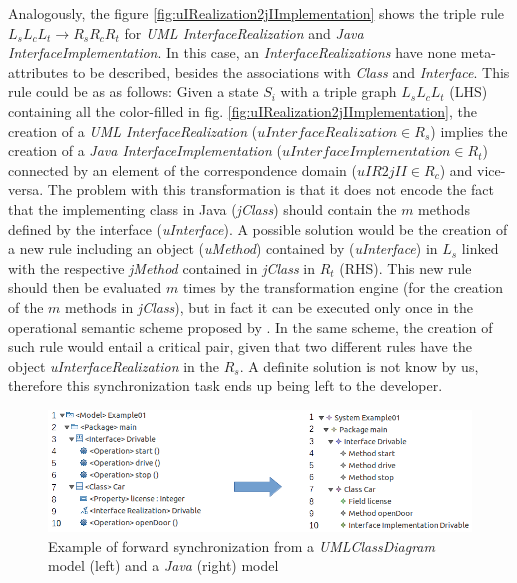 \documentclass[tuberlin,cic,tc,english,noabntcite]{iiufrgs}
\begin{document}
Analogously, the figure \ref{fig:uIRealization2jIImplementation} shows the triple rule $L_sL_cL_t \rightarrow R_sR_cR_t$ for \emph{UML InterfaceRealization} and \emph{Java InterfaceImplementation}. In this case, an \emph{InterfaceRealizations} have none meta-attributes to be described, besides the associations with \emph{Class} and \emph{Interface}. This rule could be as as follows: Given a state $S_i$ with a triple graph $L_sL_cL_t$ (LHS) containing all the color-filled in fig. \ref{fig:uIRealization2jIImplementation}, the creation of a \emph{UML InterfaceRealization} ($uInterfaceRealization \in R_s$) implies the creation of a \emph{Java InterfaceImplementation} ($uInterfaceImplementation \in R_t$) connected by an element of the correspondence domain ($uIR2jII \in R_c$) and vice-versa. The problem with this transformation is that it does not encode the fact that the implementing class in Java (\emph{jClass}) should contain the $m$ methods defined by the interface (\emph{uInterface}). A possible solution would be the creation of a new rule including an object (\emph{uMethod}) contained by (\emph{uInterface}) in $L_s$ linked with the respective \emph{jMethod} contained in \emph{jClass} in $R_t$ (RHS). This new rule should then be evaluated $m$ times by the transformation engine (for the creation of the $m$ methods in \emph{jClass}), but in fact it can be executed only once in the operational semantic scheme proposed by \citet[p. 9]{giese2010toward}. In the same scheme, the creation of such rule would entail a critical pair, given that two different rules have the object \emph{uInterfaceRealization} in the $R_s$. A definite solution is not know by us, therefore this synchronization task ends up being left to the developer.

\begin{figure}[h]
    \caption{Example of forward synchronization from a \emph{UMLClassDiagram} model (left) and a \emph{Java} (right) model}
    \begin{center}
       	\includegraphics[width=.9\textwidth]{umlClassDiagram2java_Example01}
    \end{center}
    \label{fig:umlClassDiagram2java_Example01}
\end{figure}
\end{document}
